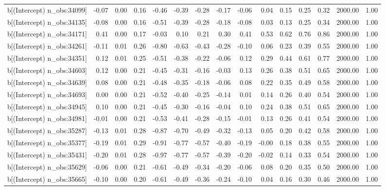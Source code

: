 \begin{table}[ht]
\begin{tabular}{rrrrrrrrrrrrrrr}
  b[(Intercept) n\_obs:34099] & -0.07 & 0.00 & 0.16 & -0.46 & -0.39 & -0.28 & -0.17 & -0.06 & 0.04 & 0.15 & 0.25 & 0.32 & 2000.00 & 1.00 \\ 
  b[(Intercept) n\_obs:34135] & -0.08 & 0.00 & 0.16 & -0.51 & -0.39 & -0.28 & -0.18 & -0.08 & 0.03 & 0.13 & 0.25 & 0.34 & 2000.00 & 1.00 \\ 
  b[(Intercept) n\_obs:34171] & 0.41 & 0.00 & 0.17 & -0.03 & 0.10 & 0.21 & 0.30 & 0.41 & 0.53 & 0.62 & 0.76 & 0.86 & 2000.00 & 1.00 \\ 
  b[(Intercept) n\_obs:34261] & -0.11 & 0.01 & 0.26 & -0.80 & -0.63 & -0.43 & -0.28 & -0.10 & 0.06 & 0.23 & 0.39 & 0.55 & 2000.00 & 1.00 \\ 
  b[(Intercept) n\_obs:34351] & 0.12 & 0.01 & 0.25 & -0.51 & -0.38 & -0.22 & -0.06 & 0.12 & 0.29 & 0.44 & 0.61 & 0.77 & 2000.00 & 1.00 \\ 
  b[(Intercept) n\_obs:34603] & 0.12 & 0.00 & 0.21 & -0.45 & -0.31 & -0.16 & -0.03 & 0.13 & 0.26 & 0.38 & 0.51 & 0.65 & 2000.00 & 1.00 \\ 
  b[(Intercept) n\_obs:34639] & 0.08 & 0.00 & 0.21 & -0.48 & -0.35 & -0.18 & -0.06 & 0.08 & 0.22 & 0.35 & 0.49 & 0.58 & 2000.00 & 1.00 \\ 
  b[(Intercept) n\_obs:34693] & 0.00 & 0.00 & 0.21 & -0.52 & -0.40 & -0.25 & -0.14 & 0.01 & 0.14 & 0.26 & 0.40 & 0.54 & 2000.00 & 1.00 \\ 
  b[(Intercept) n\_obs:34945] & 0.10 & 0.00 & 0.21 & -0.45 & -0.30 & -0.16 & -0.04 & 0.10 & 0.24 & 0.38 & 0.51 & 0.65 & 2000.00 & 1.00 \\ 
  b[(Intercept) n\_obs:34981] & -0.01 & 0.00 & 0.21 & -0.53 & -0.41 & -0.28 & -0.15 & -0.01 & 0.13 & 0.26 & 0.41 & 0.54 & 2000.00 & 1.00 \\ 
  b[(Intercept) n\_obs:35287] & -0.13 & 0.01 & 0.28 & -0.87 & -0.70 & -0.49 & -0.32 & -0.13 & 0.05 & 0.20 & 0.42 & 0.58 & 2000.00 & 1.00 \\ 
  b[(Intercept) n\_obs:35377] & -0.19 & 0.01 & 0.29 & -0.91 & -0.77 & -0.57 & -0.40 & -0.19 & -0.00 & 0.18 & 0.38 & 0.55 & 2000.00 & 1.00 \\ 
  b[(Intercept) n\_obs:35431] & -0.20 & 0.01 & 0.28 & -0.97 & -0.77 & -0.57 & -0.39 & -0.20 & -0.02 & 0.14 & 0.33 & 0.54 & 2000.00 & 1.00 \\ 
  b[(Intercept) n\_obs:35629] & -0.06 & 0.00 & 0.21 & -0.61 & -0.49 & -0.34 & -0.20 & -0.06 & 0.08 & 0.20 & 0.35 & 0.50 & 2000.00 & 1.00 \\ 
  b[(Intercept) n\_obs:35665] & -0.10 & 0.00 & 0.20 & -0.61 & -0.49 & -0.36 & -0.24 & -0.10 & 0.04 & 0.16 & 0.30 & 0.46 & 2000.00 & 1.00 \\ 

\end{tabular}
\end{table}
